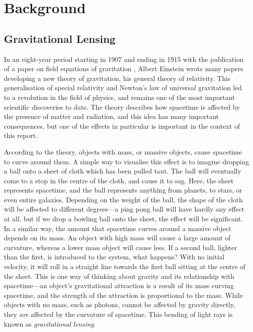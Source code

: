 \documentclass[a4paper,11pt]{article}
\begin{document}
\section{Background}
\label{sec-2}
\subsection{Gravitational Lensing}
\label{sec-2-1}

In an eight-year period starting in 1907 and ending in 1915 with the publication
of a paper on field equations of gravitation \cite{einstein1915general}, Albert
Einstein wrote many papers developing a new theory of gravitation, his general
theory of relativity. This generalisation of special relativity and Newton's law
of universal gravitation led to a revolution in the field of physics, and
remains one of the most important scientific discoveries to date. The theory
describes how spacetime is affected by the presence of matter and radiation, and
this idea has many important consequences, but one of the effects in particular
is important in the context of this report.

According to the theory, objects with mass, or massive objects, cause spacetime
to curve around them. A simple way to visualise this effect is to imagine
dropping a ball onto a sheet of cloth which has been pulled taut. The ball will
eventually come to a stop in the centre of the cloth, and cause it to sag. Here,
the sheet represents spacetime, and the ball represents anything from planets,
to stars, or even entire galaxies. Depending on the weight of the ball, the
shape of the cloth will be affected to different degrees---a ping pong ball will
have hardly any effect at all, but if we drop a bowling ball onto the sheet, the
effect will be significant. In a similar way, the amount that spacetime curves
around a massive object depends on its mass. An object with high mass will cause
a large amount of curvature, whereas a lower mass object will cause less. If a
second ball, lighter than the first, is introduced to the system, what happens?
With no initial velocity, it will roll in a straight line towards the first ball
sitting at the centre of the sheet. This is one way of thinking about gravity
and its relationship with spacetime---an object's gravitational attraction is a
result of its mass curving spacetime, and the strength of the attraction is
proportional to the mass. While objects with no mass, such as photons, cannot be
affected by gravity directly, they \emph{are} affected by the curvature of
spacetime. This bending of light rays is known as
\emph{gravitational lensing}.
\end{document}
